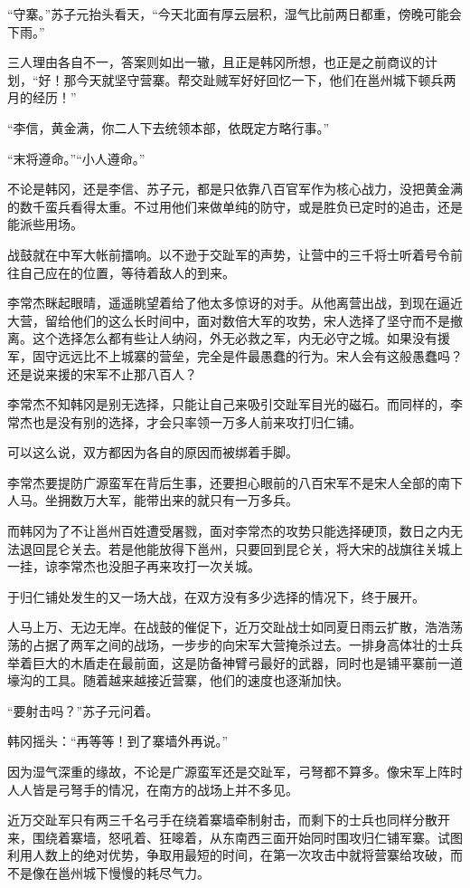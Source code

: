 “守寨。”苏子元抬头看天，“今天北面有厚云层积，湿气比前两日都重，傍晚可能会下雨。”

三人理由各自不一，答案则如出一辙，且正是韩冈所想，也正是之前商议的计划，“好！那今天就坚守营寨。帮交趾贼军好好回忆一下，他们在邕州城下顿兵两月的经历！”

“李信，黄金满，你二人下去统领本部，依既定方略行事。”

“末将遵命。”“小人遵命。”

不论是韩冈，还是李信、苏子元，都是只依靠八百官军作为核心战力，没把黄金满的数千蛮兵看得太重。不过用他们来做单纯的防守，或是胜负已定时的追击，还是能派些用场。

战鼓就在中军大帐前擂响。以不逊于交趾军的声势，让营中的三千将士听着号令前往自己应在的位置，等待着敌人的到来。

李常杰眯起眼晴，遥遥眺望着给了他太多惊讶的对手。从他离营出战，到现在逼近大营，留给他们的这么长时间中，面对数倍大军的攻势，宋人选择了坚守而不是撤离。这个选择怎么都有些让人纳闷，外无必救之军，内无必守之城。如果没有援军，固守远远比不上城寨的营垒，完全是件最愚蠢的行为。宋人会有这般愚蠢吗？还是说来援的宋军不止那八百人？

李常杰不知韩冈是别无选择，只能让自己来吸引交趾军目光的磁石。而同样的，李常杰也是没有别的选择，才会只率领一万多人前来攻打归仁铺。

可以这么说，双方都因为各自的原因而被绑着手脚。

李常杰要提防广源蛮军在背后生事，还要担心眼前的八百宋军不是宋人全部的南下人马。坐拥数万大军，能带出来的就只有一万多兵。

而韩冈为了不让邕州百姓遭受屠戮，面对李常杰的攻势只能选择硬顶，数日之内无法退回昆仑关去。若是他能放得下邕州，只要回到昆仑关，将大宋的战旗往关城上一挂，谅李常杰也没胆子再来攻打一次关城。

于归仁铺处发生的又一场大战，在双方没有多少选择的情况下，终于展开。

人马上万、无边无岸。在战鼓的催促下，近万交趾战士如同夏日雨云扩散，浩浩荡荡的占据了两军之间的战场，一步步的向宋军大营掩杀过去。一排身高体壮的士兵举着巨大的木盾走在最前面，这是防备神臂弓最好的武器，同时也是铺平寨前一道壕沟的工具。随着越来越接近营寨，他们的速度也逐渐加快。

“要射击吗？”苏子元问着。

韩冈摇头：“再等等！到了寨墙外再说。”

因为湿气深重的缘故，不论是广源蛮军还是交趾军，弓弩都不算多。像宋军上阵时人人皆是弓弩手的情况，在南方的战场上并不多见。

近万交趾军只有两三千名弓手在绕着寨墙牵制射击，而剩下的士兵也同样分散开来，围绕着寨墙，怒吼着、狂嗥着，从东南西三面开始同时围攻归仁铺军寨。试图利用人数上的绝对优势，争取用最短的时间，在第一次攻击中就将营寨给攻破，而不是像在邕州城下慢慢的耗尽气力。

